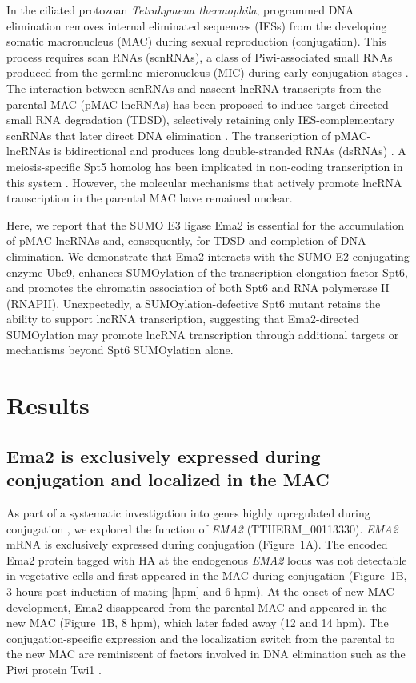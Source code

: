 \documentclass[11pt]{article}
\begin{document}
In the ciliated protozoan \textit{Tetrahymena thermophila}, programmed DNA elimination removes internal eliminated sequences (IESs) from the developing somatic macronucleus (MAC) during sexual reproduction (conjugation). This process requires scan RNAs (scnRNAs), a class of Piwi-associated small RNAs produced from the germline micronucleus (MIC) during early conjugation stages \citep{mochizuki2002analysis}. The interaction between scnRNAs and nascent lncRNA transcripts from the parental MAC (pMAC-lncRNAs) has been proposed to induce target-directed small RNA degradation (TDSD), selectively retaining only IES-complementary scnRNAs that later direct DNA elimination \citep{aronica2008study,noto2018}. The transcription of pMAC-lncRNAs is bidirectional and produces long double-stranded RNAs (dsRNAs) \citep{chalker2001,woo2016,mochizuki2005,malone2005}. A meiosis-specific Spt5 homolog has been implicated in non-coding transcription in this system \citep{kawakami2017}. However, the molecular mechanisms that actively promote lncRNA transcription in the parental MAC have remained unclear.

Here, we report that the SUMO E3 ligase Ema2 is essential for the accumulation of pMAC-lncRNAs and, consequently, for TDSD and completion of DNA elimination. We demonstrate that Ema2 interacts with the SUMO E2 conjugating enzyme Ubc9, enhances SUMOylation of the transcription elongation factor Spt6, and promotes the chromatin association of both Spt6 and RNA polymerase II (RNAPII). Unexpectedly, a SUMOylation-defective Spt6 mutant retains the ability to support lncRNA transcription, suggesting that Ema2-directed SUMOylation may promote lncRNA transcription through additional targets or mechanisms beyond Spt6 SUMOylation alone.

\section{Results}

\subsection{Ema2 is exclusively expressed during conjugation and localized in the MAC}

As part of a systematic investigation into genes highly upregulated during conjugation \citep{loidl2021}, we explored the function of \textit{EMA2} (TTHERM\_00113330). \textit{EMA2} mRNA is exclusively expressed during conjugation (Figure~1A). The encoded Ema2 protein tagged with HA at the endogenous \textit{EMA2} locus was not detectable in vegetative cells and first appeared in the MAC during conjugation (Figure~1B, 3 hours post-induction of mating [hpm] and 6 hpm). At the onset of new MAC development, Ema2 disappeared from the parental MAC and appeared in the new MAC (Figure~1B, 8 hpm), which later faded away (12 and 14 hpm). The conjugation-specific expression and the localization switch from the parental to the new MAC are reminiscent of factors involved in DNA elimination such as the Piwi protein Twi1 \citep{mochizuki2002analysis,liu2007h3k9,noto2010}.
\end{document}

